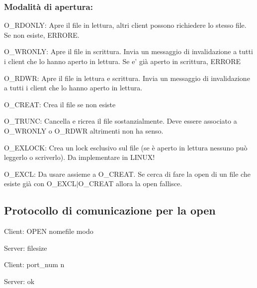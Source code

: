 \subsubsection*{Modalità di apertura\+:}


\begin{DoxyItemize}
\item O\+\_\+\+R\+D\+O\+N\+L\+Y\+: Apre il file in lettura, altri client possono richiedere lo stesso file. Se non esiste, E\+R\+R\+O\+R\+E.
\item O\+\_\+\+W\+R\+O\+N\+L\+Y\+: Apre il file in scrittura. Invia un messaggio di invalidazione a tutti i client che lo hanno aperto in lettura. Se e' già aperto in scrittura, E\+R\+R\+O\+R\+E
\item O\+\_\+\+R\+D\+W\+R\+: Apre il file in lettura e scrittura. Invia un messaggio di invalidazione a tutti i client che lo hanno aperto in lettura.
\item O\+\_\+\+C\+R\+E\+A\+T\+: Crea il file se non esiste
\item O\+\_\+\+T\+R\+U\+N\+C\+: Cancella e ricrea il file sostanzialmente. Deve essere associato a O\+\_\+\+W\+R\+O\+N\+L\+Y o O\+\_\+\+R\+D\+W\+R altrimenti non ha senso.
\item O\+\_\+\+E\+X\+L\+O\+C\+K\+: Crea un lock esclusivo sul file (se è aperto in lettura nessuno può leggerlo o scriverlo). Da implementare in L\+I\+N\+U\+X!
\item O\+\_\+\+E\+X\+C\+L\+: Da usare assieme a O\+\_\+\+C\+R\+E\+A\+T. Se cerca di fare la open di un file che esiste già con O\+\_\+\+E\+X\+C\+L$\vert$\+O\+\_\+\+C\+R\+E\+A\+T allora la open fallisce. 

 \subsection*{Protocollo di comunicazione per la open}
\end{DoxyItemize}


\begin{DoxyEnumerate}
\item Client\+: O\+P\+E\+N nomefile modo
\item Server\+: filesize
\item Client\+: port\+\_\+num n
\item Server\+: ok
\end{DoxyEnumerate}

